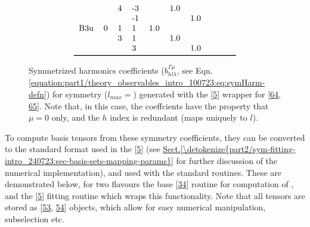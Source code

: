 \documentclass[letterpaper,table,10pt,english]{jupyterBook}
\begin{document}
\begin{figure}[htbp]
\begin{equation*}
\begin{split}
\begin{tabular}{llllllllll}
    &   & 4 & -3 &      &  1.0 &      &      &      &      \\
    &   &   & -1 &      &      &  1.0 &      &      &      \\
B3u & 0 & 1 &  1 &  1.0 &      &      &      &      &      \\
    &   & 3 &  1 &      &  1.0 &      &      &      &      \\
    &   &   &  3 &      &      &  1.0 &      &      &      \\
\bottomrule
\end{tabular}\end{split}
\end{equation*}\caption{Symmetrized harmonics coefficients (\(b_{hl\lambda}^{\Gamma\mu}\), see Eqn. \eqref{equation:part1/theory_observables_intro_100723:eq:symHarm-defn}) for  symmetry (\(l_{max}=\)) generated with the  {[}\hyperlink{cite.backmatter/bibliography:id682}{5}{]} wrapper for  {[}\hyperlink{cite.backmatter/bibliography:id708}{64}, \hyperlink{cite.backmatter/bibliography:id709}{65}{]}. Note that, in this case, the coeffcients have the property that \(\mu=0\) only, and the \(h\) index is redundant (maps uniquely to \(l\)).}\label{\detokenize{part1/theory_tensor_formalism_160723:tab-d2hxlm}}\end{figure}

\sphinxAtStartPar
To compute basis tensors from these symmetry coefficients, they can be converted to the standard {\hyperref[\detokenize{backmatter/glossary:term-radial-matrix-elements}]{}} format used in the  {[}\hyperlink{cite.backmatter/bibliography:id682}{5}{]} (see \hyperref[\detokenize{part2/sym-fitting-intro_240723:sec-basis-sets-mapping-params}]{Sect.\@ \ref{\detokenize{part2/sym-fitting-intro_240723:sec-basis-sets-mapping-params}}} for further discussion of the numerical implementation), and used with the standard routines. These are demonstrated below, for two flavours \sphinxhyphen{} the base  {[}\hyperlink{cite.backmatter/bibliography:id608}{34}{]} routine for computation of {\hyperref[\detokenize{backmatter/glossary:term-AF}]{}}, and the  {[}\hyperlink{cite.backmatter/bibliography:id682}{5}{]} fitting routine which wraps this functionality. Note that all tensors are stored as  {[}\hyperlink{cite.backmatter/bibliography:id698}{53}, \hyperlink{cite.backmatter/bibliography:id975}{54}{]} objects, which allow for easy numerical manipulation, subselection etc.
\end{document}
